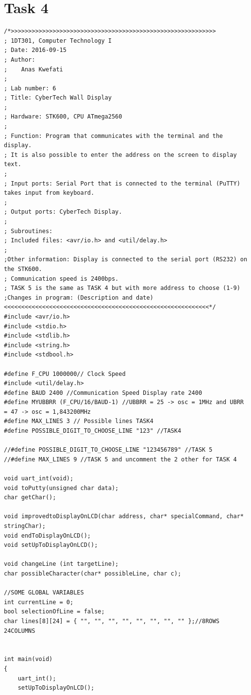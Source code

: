 \documentclass[a4paper,12pt]{article}
\begin{document}
\break

\section{Task 4}

\lstset{style=CStyle}

\begin{lstlisting}[style=CStyle]
/*>>>>>>>>>>>>>>>>>>>>>>>>>>>>>>>>>>>>>>>>>>>>>>>>>>>>>>>>>>>
; 1DT301, Computer Technology I
; Date: 2016-09-15
; Author:
;    Anas Kwefati
;
; Lab number: 6
; Title: CyberTech Wall Display
;
; Hardware: STK600, CPU ATmega2560
;
; Function: Program that communicates with the terminal and the display.
; It is also possible to enter the address on the screen to display text.
;
; Input ports: Serial Port that is connected to the terminal (PuTTY) takes input from keyboard.
;
; Output ports: CyberTech Display.
;
; Subroutines:
; Included files: <avr/io.h> and <util/delay.h>
;
;Other information: Display is connected to the serial port (RS232) on the STK600.
; Communication speed is 2400bps.
; TASK 5 is the same as TASK 4 but with more address to choose (1-9)
;Changes in program: (Description and date)
<<<<<<<<<<<<<<<<<<<<<<<<<<<<<<<<<<<<<<<<<<<<<<<<<<<<<<<<<<<*/
#include <avr/io.h>
#include <stdio.h>
#include <stdlib.h>
#include <string.h>
#include <stdbool.h>

#define F_CPU 1000000// Clock Speed
#include <util/delay.h>
#define BAUD 2400 //Communication Speed Display rate 2400
#define MYUBBRR (F_CPU/16/BAUD-1) //UBBRR = 25 -> osc = 1MHz and UBRR = 47 -> osc = 1,843200MHz
#define MAX_LINES 3 // Possible lines TASK4
#define POSSIBLE_DIGIT_TO_CHOOSE_LINE "123" //TASK4

//#define POSSIBLE_DIGIT_TO_CHOOSE_LINE "123456789" //TASK 5
//#define MAX_LINES 9 //TASK 5 and uncomment the 2 other for TASK 4

void uart_int(void);
void toPutty(unsigned char data);
char getChar();

void improvedtoDisplayOnLCD(char address, char* specialCommand, char* stringChar);
void endToDisplayOnLCD();
void setUpToDisplayOnLCD();

void changeLine (int targetLine);
char possibleCharacter(char* possibleLine, char c);

//SOME GLOBAL VARIABLES
int currentLine = 0;
bool selectionOfLine = false;
char lines[8][24] = { "", "", "", "", "", "", "", "" };//8ROWS 24COLUMNS


int main(void)
{
	uart_int();
	setUpToDisplayOnLCD();
	

\end{lstlisting}
\end{document}
